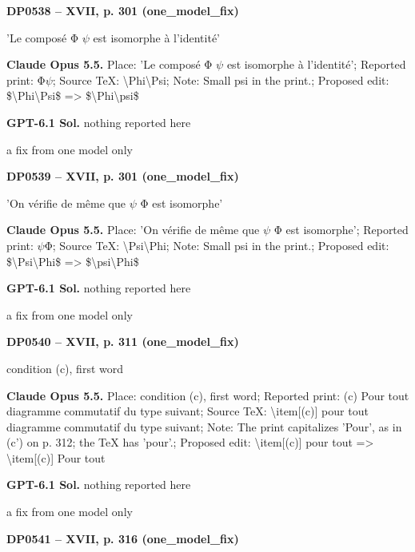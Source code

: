 \par\noindent\hypertarget{DP0538}{}\textbf{DP0538 -- XVII, p. 301 (one\_model\_fix)}\par
'Le composé Φ \ensuremath{\psi} est isomorphe à l'identité'\par
\textbf{Claude Opus 5.5.} Place: 'Le composé Φ \ensuremath{\psi} est isomorphe à l'identité'; Reported print: Φ\ensuremath{\psi}; Source TeX: \textbackslash{}Phi\textbackslash{}Psi; Note: Small psi in the print.; Proposed edit: \$\textbackslash{}Phi\textbackslash{}Psi\$ =\allowbreak > \$\textbackslash{}Phi\textbackslash{}psi\$\par
\textbf{GPT-6.1 Sol.} nothing reported here\par
a fix from one model only\par
\par\noindent\hypertarget{DP0539}{}\textbf{DP0539 -- XVII, p. 301 (one\_model\_fix)}\par
'On vérifie de même que \ensuremath{\psi} Φ est isomorphe'\par
\textbf{Claude Opus 5.5.} Place: 'On vérifie de même que \ensuremath{\psi} Φ est isomorphe'; Reported print: \ensuremath{\psi}Φ; Source TeX: \textbackslash{}Psi\textbackslash{}Phi; Note: Small psi in the print.; Proposed edit: \$\textbackslash{}Psi\textbackslash{}Phi\$ =\allowbreak > \$\textbackslash{}psi\textbackslash{}Phi\$\par
\textbf{GPT-6.1 Sol.} nothing reported here\par
a fix from one model only\par
\par\noindent\hypertarget{DP0540}{}\textbf{DP0540 -- XVII, p. 311 (one\_model\_fix)}\par
condition (c), first word\par
\textbf{Claude Opus 5.5.} Place: condition (c), first word; Reported print: (c) Pour tout diagramme commutatif du type suivant; Source TeX: \textbackslash{}item[(c)] pour tout diagramme commutatif du type suivant; Note: The print capitalizes 'Pour', as in (c') on p. 312; the TeX has 'pour'.; Proposed edit: \textbackslash{}item[(c)] pour tout =\allowbreak > \textbackslash{}item[(c)] Pour tout\par
\textbf{GPT-6.1 Sol.} nothing reported here\par
a fix from one model only\par
\par\noindent\hypertarget{DP0541}{}\textbf{DP0541 -- XVII, p. 316 (one\_model\_fix)}\par
